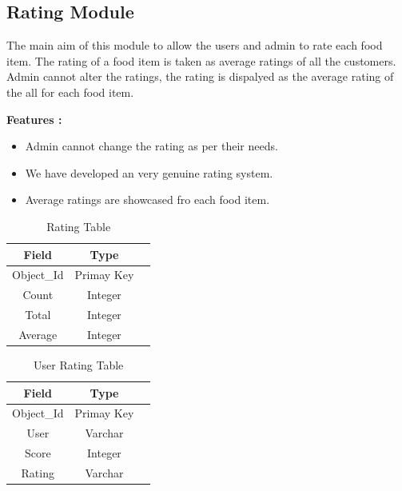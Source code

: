 \documentclass[12pt,a4paper]{report}
\begin{document}
\subsection{Rating Module}
\hspace{0.25cm}
\par
The main aim of this module to allow the users and admin to rate each food item.  The rating of a food item is taken as average ratings of all the customers. Admin cannot alter the ratings, the rating is dispalyed as the average rating of the all for each food item.
\newline
\par
\textbf{Features :}
\begin{itemize}
	\item Admin cannot change the rating as per their needs.
	\item We have developed an very genuine rating system.
	\item Average ratings are showcased fro each food item.
\end{itemize}

\begin{table}
\begin{center}
  \begin{tabular}{ |c|c|c| } 
  \hline
  Field & Type  \\
  \hline
  Object\_Id & Primay Key \\
  \hline
  Count & Integer \\
  \hline
  Total & Integer \\
  \hline
  Average & Integer \\
  \hline
  \end{tabular}
  \caption{ Rating Table }
  \end{center}
\end{table}

\begin{table}
  \begin{center}
    \begin{tabular}{ |c|c|c| } 
    \hline
    Field & Type  \\
    \hline
    Object\_Id & Primay Key \\
    \hline
    User & Varchar \\
    \hline
    Score & Integer \\
    \hline
    Rating & Varchar \\
    \hline
    \end{tabular}
    \caption{ User Rating Table }
    \end{center}
  \end{table}
\end{document}
